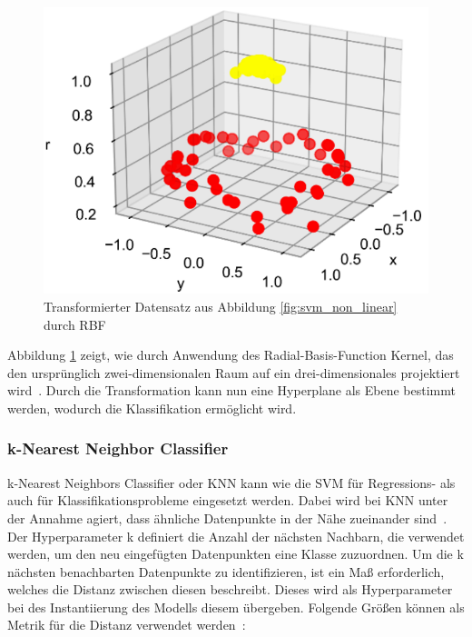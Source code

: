 \begin{figure}[h]
    \centering
    \includegraphics[scale=0.5]{figures/svm_kernel_transformation.png}
    \caption{Transformierter Datensatz aus Abbildung \ref{fig:svm_non_linear} durch RBF}
    \label{fig:svm_transformed}
\end{figure}

Abbildung \ref{fig:svm_transformed} zeigt, wie durch Anwendung des Radial-Basis-Function Kernel, das den ursprünglich zwei-dimensionalen Raum auf ein drei-dimensionales projektiert wird~\cite[S. 442]{10.5555/3133359}.
Durch die Transformation kann nun eine Hyperplane als Ebene bestimmt werden, wodurch die Klassifikation ermöglicht wird.

\pagebreak

\subsubsection*{k-Nearest Neighbor Classifier}

k-Nearest Neighbors Classifier oder KNN kann wie die SVM für Regressions- als auch für Klassifikationsprobleme eingesetzt werden. Dabei wird bei KNN unter der Annahme agiert, dass ähnliche Datenpunkte in der Nähe zueinander sind~\cite[S. 216]{10.5555/2904392}.
Der Hyperparameter k definiert die Anzahl der nächsten Nachbarn, die verwendet werden, um den neu eingefügten Datenpunkten eine Klasse zuzuordnen. Um die k nächsten benachbarten Datenpunkte zu identifizieren, ist ein Maß erforderlich, welches die Distanz zwischen diesen beschreibt. Dieses wird als Hyperparameter bei des Instantiierung des Modells diesem übergeben.
Folgende Größen können als Metrik für die Distanz verwendet werden~\cite[S. 6]{doi:10.1089/big.2018.0175}:

